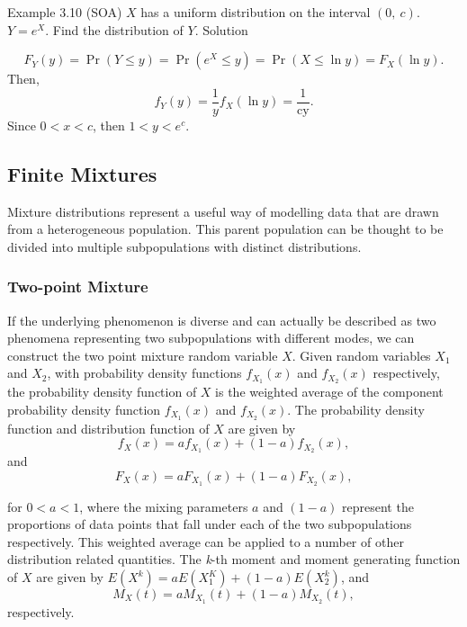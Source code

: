 \documentclass[]{book}
\begin{document}
Example 3.10 (SOA) \(X\) has a uniform distribution on the interval
\((0,\ c)\). \(Y = e^{X}\). Find the distribution of \(Y\). Solution

\[F_{Y}\left( y \right) = \Pr\left( Y \leq y \right) = \Pr\left( e^{X} \leq y \right) = \Pr\left( X \leq \ln y \right) = F_{X}\left( \ln y \right).\]
Then,
\[f_{Y}\left( y \right) = \frac{1}{y}f_{X}\left(\ln y \right) = \frac{1}{\text{cy}}. \]
Since \(0 < x < c\), then \(1 < y < e^{c}\).

\subsection{Finite Mixtures}\label{finite-mixtures}

Mixture distributions represent a useful way of modelling data that are
drawn from a heterogeneous population. This parent population can be
thought to be divided into multiple subpopulations with distinct
distributions.

\subsubsection{Two-point Mixture}\label{two-point-mixture}

If the underlying phenomenon is diverse and can actually be described as
two phenomena representing two subpopulations with different modes, we
can construct the two point mixture random variable \(X\). Given random
variables \(X_{1}\) and \(X_{2}\), with probability density functions
\(f_{X_{1}}\left( x \right)\) and \(f_{X_{2}}\left( x \right)\)
respectively, the probability density function of \(X\) is the weighted
average of the component probability density function
\(f_{X_{1}}\left( x \right)\) and \(f_{X_{2}}\left( x \right)\). The
probability density function and distribution function of \(X\) are
given by
\[f_{X}\left( x \right) = af_{X_{1}}\left( x \right) + \left( 1 - a \right)f_{X_{2}}\left( x \right),\]
and
\[F_{X}\left( x \right) = aF_{X_{1}}\left( x \right) + \left( 1 - a \right)F_{X_{2}}\left( x \right),\]

for \(0 < a <1\), where the mixing parameters \(a\) and \((1 - a)\)
represent the proportions of data points that fall under each of the two
subpopulations respectively. This weighted average can be applied to a
number of other distribution related quantities. The \emph{k}-th moment
and moment generating function of \(X\) are given by
\(E\left( X^{k} \right) = aE\left( X_{1}^{K} \right) + \left( 1 - a \right)E\left( X_{2}^{k} \right)\),
and
\[M_{X}\left( t \right) = aM_{X_{1}}\left( t \right) + \left( 1 - a \right)M_{X_{2}}\left( t \right),\]
respectively.
\end{document}
